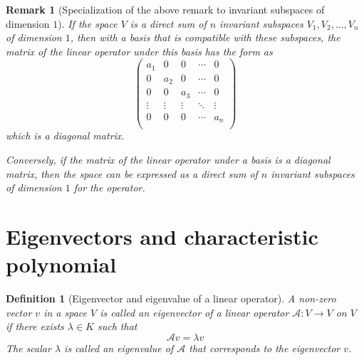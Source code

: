 \documentclass[onecolumn]{ctexart}
\newtheorem{definition}{Definition}
\newtheorem{remark}{Remark}
\begin{document}
\begin{remark}[Specialization of the above remark to invariant subspaces of dimension $1$]
  If the space $V$ is a direct sum of $n$ invariant subspaces $V_1, V_2, \ldots, V_n$ of dimension $1$, then with a basis that is compatible with these subspaces, the matrix of the linear operator under this basis has the form as
  \[
    \begin{pmatrix}
      a_1 & 0 & 0 & \cdots & 0 \\
      0 & a_2 & 0 & \cdots & 0 \\
      0 & 0 & a_3 & \cdots & 0 \\
      \vdots & \vdots & \vdots & \ddots & \vdots \\
      0 & 0 & 0 & \cdots & a_n \\
    \end{pmatrix}
  \]
  which is a diagonal matrix.

  Conversely, if the matrix of the linear operator under a basis is a diagonal 
  matrix, then the space can be expressed as a direct sum of $n$ invariant 
  subspaces of dimension $1$ for the operator.
\end{remark}

\section{Eigenvectors and characteristic polynomial}

\begin{definition}[Eigenvector and eigenvalue of a linear operator]
  A non-zero vector $v$ in a space $V$ is called an eigenvector of a linear operator $\mathcal{A}: V \to V$ on $V$ if there exists $\lambda \in K$ such that
  \[
    \mathcal{A}v = \lambda v
  \]
  The scalar $\lambda$ is called an eigenvalue of $\mathcal{A}$ that corresponds to the eigenvector $v$.
\end{definition}
\end{document}
